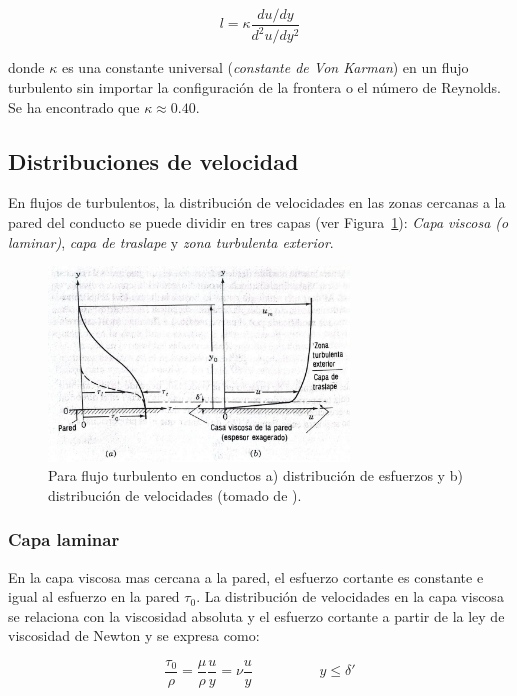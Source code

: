 \documentclass[11pt, oneside]{article}
\begin{document}
\begin{equation}
l= \kappa \frac{du/dy}{d^2 u / dy^2}
\label{tur13}
\end{equation}

donde $\kappa$ es una constante universal (\emph{constante de Von Karman}) en un flujo turbulento sin importar la configuraci\'on de la frontera o el n\'umero de Reynolds. Se ha encontrado que $\kappa \approx 0.40$.

\subsection{Distribuciones de velocidad} %
En flujos de turbulentos, la distribuci\'on de velocidades en las zonas cercanas a la pared del conducto se puede dividir en tres capas (ver Figura~\ref{distr}): \emph{Capa viscosa (o laminar)}, \emph{capa de traslape} y \emph{zona turbulenta exterior}. 

\begin{figure}[h]
\centering
\includegraphics[width=8cm]{distr.jpeg}
\caption{Para flujo turbulento en conductos a) distribuci\'on de esfuerzos y b) distribuci\'on de velocidades (tomado de \cite{streeter}).}
\label{distr}
\end{figure}


\subsubsection*{Capa laminar} %
En la capa viscosa mas cercana a la pared, el esfuerzo cortante es constante e igual al esfuerzo en la pared $\tau_0$. La distribuci\'on de velocidades en la capa viscosa se relaciona con la viscosidad absoluta y el esfuerzo cortante a partir de la ley de viscosidad de Newton  y se expresa como:

\begin{equation}
\frac{\tau_0 }{\rho} = \frac{\mu}{\rho}\frac{u}{y} = \nu \frac{u}{y} \hspace{2cm} y \leq \delta'
\label{dist1}
\end{equation}
\end{document}
